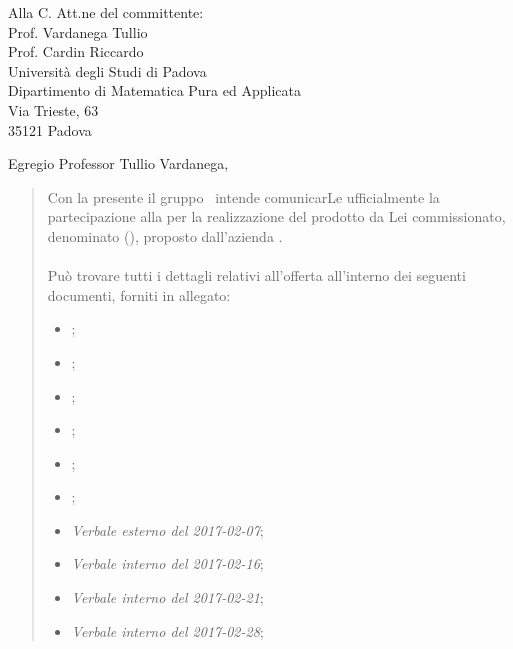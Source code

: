 \documentclass{letter}
\date{Padova, 6 Marzo 2017}
\begin{document}
\begin{letter}{
	Alla C. Att.ne del committente: \\
	Prof. Vardanega Tullio \\
	Prof. Cardin Riccardo \\
	Università degli Studi di Padova \\
	Dipartimento di Matematica Pura ed Applicata \\
	Via Trieste, 63 \\
	35121 Padova
}


\opening{Egregio Professor Tullio Vardanega,}

\begin{quotation}

	Con la presente il gruppo \kpanic\ intende comunicarLe ufficialmente la partecipazione alla \textbf{\revisionediprogettazionemax} per la realizzazione del prodotto da Lei commissionato, denominato \textbf{\atavi} (\textbf{\acratavi}), proposto dall'azienda \textbf{\prop}.\\\\
	Può trovare tutti i dettagli relativi all'offerta all'interno dei seguenti documenti, forniti in allegato:\vspace{0.5em}

	\begin{itemize}
		\item \analisideirequisitiv;
		\item {};
		\item \glossariov;
		\item \normediprogettov;
		\item \pianodiprogettov;
		\item \pianodiqualificav;
		\item \emph{Verbale esterno del 2017-02-07};
		\item \emph{Verbale interno del 2017-02-16};
		\item \emph{Verbale interno del 2017-02-21};
		\item \emph{Verbale interno del 2017-02-28};
		\vspace{0.5em}
	\end{itemize}
	

\end{quotation}
\end{letter}
\end{document}
